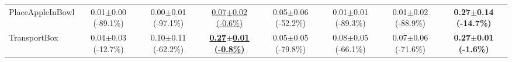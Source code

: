 \begin{table}[htbp]
\begin{adjustbox}{max width=\textwidth}
\begin{tabular}{l*{7}{c}}
PlaceAppleInBowl & 0.01$\pm$0.00 \scriptsize{(-89.1\%)} & 0.00$\pm$0.01 \scriptsize{(-97.1\%)} & \underline{0.07$\pm$0.02 \scriptsize{(-0.6\%)}} & 0.05$\pm$0.06 \scriptsize{(-52.2\%)} & 0.01$\pm$0.01 \scriptsize{(-89.3\%)} & 0.01$\pm$0.02 \scriptsize{(-88.9\%)} & \textbf{0.27$\pm$0.14 \scriptsize{(-14.7\%)}} \\
TransportBox & 0.04$\pm$0.03 \scriptsize{(-12.7\%)} & 0.10$\pm$0.11 \scriptsize{(-62.2\%)} & \textbf{\underline{0.27$\pm$0.01 \scriptsize{(-0.8\%)}}} & 0.05$\pm$0.05 \scriptsize{(-79.8\%)} & 0.08$\pm$0.05 \scriptsize{(-66.1\%)} & 0.07$\pm$0.06 \scriptsize{(-71.6\%)} & \textbf{0.27$\pm$0.01 \scriptsize{(-1.6\%)}} \\
\bottomrule
\end{tabular}
\end{adjustbox}
\end{table}

